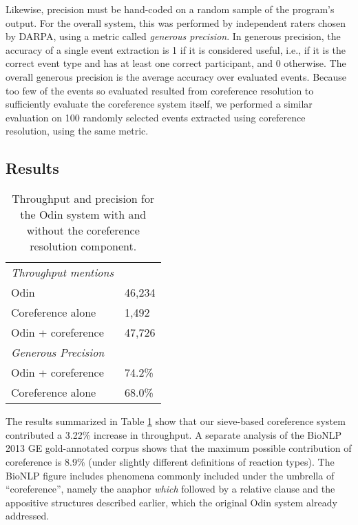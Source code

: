 Likewise, precision must be hand-coded on a random sample of the program's output. For the overall system, this was performed 
by independent raters chosen by DARPA, using a metric called {\it generous precision}. In generous precision, the accuracy of a 
single event extraction is 1 if it is considered useful, i.e., if it is the correct event type and has at least one correct participant, and 0 
otherwise. The overall generous precision is the average accuracy over evaluated events. Because too few of the events so evaluated 
resulted from coreference resolution to sufficiently evaluate the coreference system itself, we performed a similar evaluation on 
100 randomly selected events extracted using coreference resolution, using the same metric.

\subsection{Results}

\begin{table}
\centering
\begin{tabular}{l l}
\toprule
{\it Throughput mentions}	\\
\hspace{1em}Odin			& 46,234	\\
\hspace{1em}Coreference alone			& 1,492	\\
\hspace{1em}Odin + coreference		& 47,726	\\
\midrule
{\it Generous Precision}	\\
\hspace{1em}Odin + coreference			& 74.2\%	\\
\hspace{1em}Coreference alone			& 68.0\%	\\
\bottomrule
\end{tabular}
\caption{Throughput and precision for the Odin system with and without the coreference resolution component.}
\label{tab:results}
\end{table}

The results summarized in Table \ref{tab:results} show that our sieve-based coreference system contributed a 3.22\% increase in 
throughput. A separate analysis of the BioNLP 2013 GE gold-annotated corpus shows that the maximum possible contribution of 
coreference is 8.9\% (under slightly different definitions of reaction types). 
The BioNLP figure includes phenomena commonly included under the umbrella of ``coreference'', namely the anaphor {\it which} followed by a relative clause and the appositive structures described earlier, which the original Odin system already addressed.

